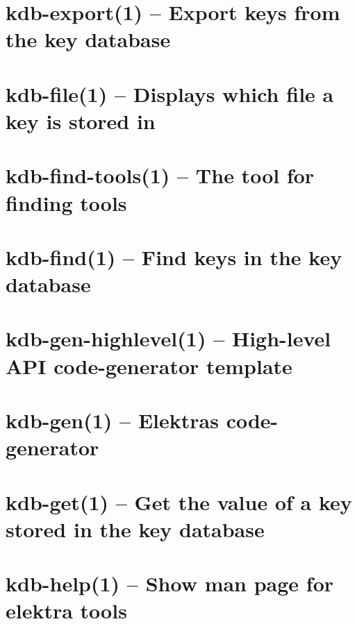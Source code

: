 \let\mypdfximage\pdfximage\def\pdfximage{\immediate\mypdfximage}\documentclass[twoside]{book}
\newcommand{\+}{\discretionary{\mbox{\scriptsize$\hookleftarrow$}}{}{}}
\begin{document}
\chapter{kdb-\/export(1) -- Export keys from the key database}
\label{doc_help_kdb-export_md}

\chapter{kdb-\/file(1) -- Displays which file a key is stored in}
\label{doc_help_kdb-file_md}

\chapter{kdb-\/find-\/tools(1) -- The tool for finding tools}
\label{doc_help_kdb-find-tools_md}

\chapter{kdb-\/find(1) -- Find keys in the key database}
\label{doc_help_kdb-find_md}

\chapter{kdb-\/gen-\/highlevel(1) -- High-\/level API code-\/generator template}
\label{doc_help_kdb-gen-highlevel_md}

\chapter{kdb-\/gen(1) -- Elektra\textquotesingle{}s code-\/generator}
\label{doc_help_kdb-gen_md}

\chapter{kdb-\/get(1) -- Get the value of a key stored in the key database}
\label{doc_help_kdb-get_md}

\chapter{kdb-\/help(1) -- Show man page for elektra tools}
\label{doc_help_kdb-help_md}

\end{document}
